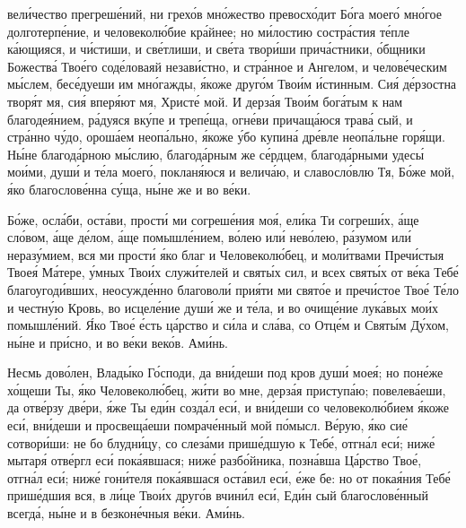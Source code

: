 \begin{mymulticols}
вел\'{и}чество прегреш\'{е}ний, ни грех\'{о}в мн\'{о}жество превосх\'{о}дит Б\'{о}га моег\'{о} мн\'{о}гое долготерп\'{е}ние, и человекол\'{ю}бие кр\'{а}йнее; но м\'{и}лостию состр\'{а}стия т\'{е}пле к\'{а}ющияся, и ч\'{и}стиши, и св\'{е}тлиши, и св\'{е}та твор\'{и}ши прич\'{а}стники, \'{о}бщники Божеств\'{а} Тво\'{е}го сод\'{е}ловаяй незав\'{и}стно, и стр\'{а}нное и Ангелом, и челов\'{е}ческим м\'{ы}слем, бес\'{е}дуеши им мн\'{о}гажды, \'{я}коже друг\'{о}м Тво\'{и}м \'{и}стинным. Си\'{я} д\'{е}рзостна твор\'{я}т мя, си\'{я} впер\'{я}ют мя, Христ\'{е} мой. И дерз\'{а}я Тво\'{и}м бог\'{а}тым к нам благоде\'{я}нием, р\'{а}дуяся вк\'{у}пе и треп\'{е}ща, огн\'{е}ви причащ\'{а}юся трав\'{а} сый, и стр\'{а}нно ч\'{у}до, орош\'{а}ем неоп\'{а}льно, \'{я}коже \'{у}бо купин\'{а} др\'{е}вле неоп\'{а}льне гор\'{я}щи. Н\'{ы}не благод\'{а}рною м\'{ы}слию, благод\'{а}рным же с\'{е}рдцем, благод\'{а}рными удес\'{ы} мо\'{и}ми, душ\'{и} и т\'{е}ла моег\'{о}, поклан\'{я}юся и велич\'{а}ю, и славосл\'{о}влю Тя, Б\'{о}же мой, \'{я}ко благослов\'{е}нна с\'{у}ща, н\'{ы}не же и во в\'{е}ки.


Б\'{о}же, осл\'{а}би, ост\'{а}ви, прост\'{и} ми согреш\'{е}ния мо\'{я}, ел\'{и}ка Ти согреш\'{и}х, \'{а}ще сл\'{о}вом, \'{а}ще д\'{е}лом, \'{а}ще помышл\'{е}нием, в\'{о}лею ил\'{и} нев\'{о}лею, р\'{а}зумом ил\'{и} нераз\'{у}мием, вся ми прост\'{и} \'{я}ко благ и Человекол\'{ю}бец, и мол\'{и}твами Преч\'{и}стыя Твое\'{я} М\'{а}тере, \'{у}мных Тво\'{и}х служ\'{и}телей и свят\'{ы}х сил, и всех свят\'{ы}х от в\'{е}ка Теб\'{е} благоугод\'{и}вших, неосужд\'{е}нно благовол\'{и} при\'{я}ти ми свят\'{о}е и преч\'{и}стое Тво\'{е} Т\'{е}ло и честн\'{у}ю Кровь, во исцел\'{е}ние душ\'{и} же и т\'{е}ла, и во очищ\'{е}ние лук\'{а}вых мо\'{и}х помышл\'{е}ний. \'{Я}ко Тво\'{е} \'{е}сть ц\'{а}рство и с\'{и}ла и сл\'{а}ва, со Отц\'{е}м и Свят\'{ы}м Д\'{у}хом, н\'{ы}не и пр\'{и}сно, и во в\'{е}ки век\'{о}в. Ам\'{и}нь.


Несмь дов\'{о}лен, Влад\'{ы}ко Г\'{о}споди, да вн\'{и}деши под кров душ\'{и} мое\'{я}; но пон\'{е}же х\'{о}щеши Ты, \'{я}ко Человекол\'{ю}бец, ж\'{и}ти во мне, дерз\'{а}я приступ\'{а}ю; повелев\'{а}еши, да отв\'{е}рзу дв\'{е}ри, \'{я}же Ты ед\'{и}н созд\'{а}л ес\'{и}, и вн\'{и}деши со человекол\'{ю}бием \'{я}коже ес\'{и}, вн\'{и}деши и просвещ\'{а}еши помрач\'{е}нный мой п\'{о}мысл. В\'{е}рую, \'{я}ко си\'{е} сотвор\'{и}ши: не бо блудн\'{и}цу, со слез\'{а}ми приш\'{е}дшую к Теб\'{е}, отгн\'{а}л ес\'{и}; ниж\'{е} мытар\'{я} отв\'{е}ргл ес\'{и} пок\'{а}явшася; ниж\'{е} разб\'{о}йника, позн\'{а}вша Ц\'{а}рство Тво\'{е}, отгн\'{а}л ес\'{и}; ниж\'{е} гон\'{и}теля пок\'{а}явшася ост\'{а}вил ес\'{и}, \'{е}же бе: но от пока\'{я}ния Теб\'{е} приш\'{е}дшия вся, в л\'{и}це Тво\'{и}х друг\'{о}в вчин\'{и}л ес\'{и}, Ед\'{и}н сый благослов\'{е}нный всегд\'{а}, н\'{ы}не и в безкон\'{е}чныя в\'{е}ки. Ам\'{и}нь.


\end{mymulticols}
